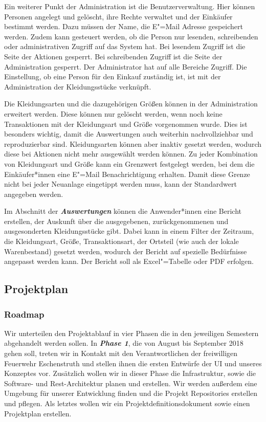 Ein weiterer Punkt der Administration ist die Benutzerverwaltung. Hier können Personen angelegt und gelöscht, ihre Rechte verwaltet und der Einkäufer bestimmt werden. Dazu müssen der Name, die E"=Mail Adresse gespeichert werden. Zudem kann gesteuert werden, ob die Person nur lesenden, schreibenden oder administrativen Zugriff auf das System hat. Bei lesendem Zugriff ist die Seite der Aktionen gesperrt. Bei schreibenden Zugriff ist die Seite der Administration gesperrt. Der Administrator hat auf alle Bereiche Zugriff. Die Einstellung, ob eine Person für den Einkauf zuständig ist, ist mit der Administration der Kleidungsstücke verknüpft. 

Die Kleidungsarten und die dazugehörigen Größen können in der Administration erweitert werden. Diese können nur gelöscht werden, wenn noch keine Transaktionen mit der Kleidungsart und Größe vorgenommen wurde. Dies ist besonders wichtig, damit die Auswertungen auch weiterhin nachvollziehbar und reproduzierbar sind. Kleidungsarten können aber inaktiv gesetzt werden, wodurch diese bei Aktionen nicht mehr ausgewählt werden können. Zu jeder Kombination von Kleidungsart und Größe kann ein Grenzwert festgelegt werden, bei dem die Einkäufer*innen eine E"=Mail Benachrichtigung erhalten. Damit diese Grenze nicht bei jeder Neuanlage eingetippt werden muss, kann der Standardwert angegeben werden.

Im Abschnitt der \textit{\textbf{Auswertungen}} können die Anwender*innen eine Bericht erstellen, der Auskunft über die ausgegebenen, zurückgenommenen und ausgesonderten Kleidungsstücke gibt. Dabei kann in einem Filter der Zeitraum, die Kleidungsart, Größe, Transaktionsart, der Ortsteil (wie auch der lokale Warenbestand) gesetzt werden, wodurch der Bericht auf spezielle Bedürfnisse angepasst werden kann. Der Bericht soll als Excel"=Tabelle oder PDF erfolgen.

\subsection{Projektplan}
\subsubsection{Roadmap}\label{sec:roadmap}

Wir unterteilen den Projektablauf in vier Phasen die in den jeweiligen Semestern abgehandelt werden sollen. In \textit{\textbf{Phase 1}}, die von August bis September 2018 gehen soll, treten wir in Kontakt mit den Verantwortlichen der freiwilligen Feuerwehr Eschenstruth und stellen ihnen die ersten Entwürfe der UI und unseres Konzeptes vor.
Zusätzlich wollen wir in dieser Phase die Infrastruktur, sowie die Software- und Rest-Architektur planen und erstellen. Wir werden außerdem eine Umgebung für unserer Entwicklung finden und die Projekt Repositories erstellen und pflegen.
Als letztes wollen wir ein Projektdefinitionsdokument sowie einen Projektplan erstellen.

